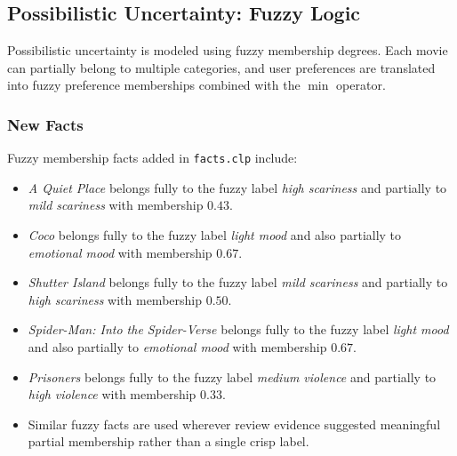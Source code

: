 \documentclass[11pt]{article}
\begin{document}
\subsection{Possibilistic Uncertainty: Fuzzy Logic}
Possibilistic uncertainty is modeled using fuzzy membership degrees. Each movie can partially belong to multiple categories, and user preferences are translated into fuzzy preference memberships combined with the $\min$ operator.

\subsubsection{New Facts}
Fuzzy membership facts added in \texttt{facts.clp} include:
\begin{itemize}
  \item \textit{A Quiet Place} belongs fully to the fuzzy label \textit{high scariness} and partially to \textit{mild scariness} with membership $0.43$.
  \item \textit{Coco} belongs fully to the fuzzy label \textit{light mood} and also partially to \textit{emotional mood} with membership $0.67$.
  \item \textit{Shutter Island} belongs fully to the fuzzy label \textit{mild scariness} and partially to \textit{high scariness} with membership $0.50$.
  \item \textit{Spider-Man: Into the Spider-Verse} belongs fully to the fuzzy label \textit{light mood} and also partially to \textit{emotional mood} with membership $0.67$.
  \item \textit{Prisoners} belongs fully to the fuzzy label \textit{medium violence} and partially to \textit{high violence} with membership $0.33$.
  \item Similar fuzzy facts are used wherever review evidence suggested meaningful partial membership rather than a single crisp label.
\end{itemize}
\end{document}
